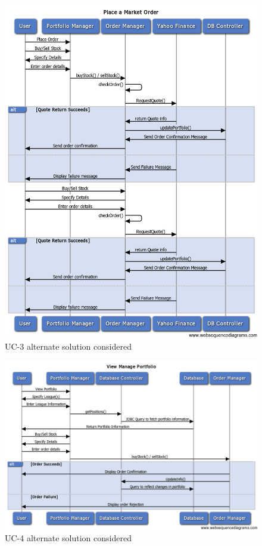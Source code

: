 \begin{figure}[H]
\centering
\includegraphics[width=5.5in]{./img/inter/alt3.png}
\caption{UC-3 alternate solution considered}
\end{figure}
\begin{figure}[H]
\centering
\includegraphics[width=5.5in]{./img/inter/alt4.png}
\caption{UC-4 alternate solution considered}
\end{figure}
